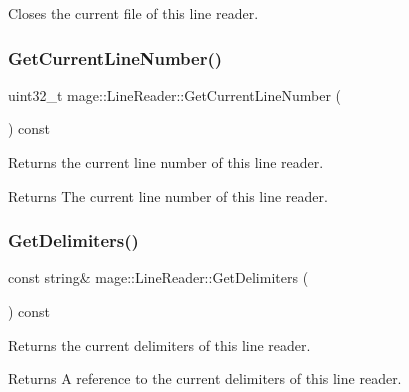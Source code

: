 Closes the current file of this line reader. \hypertarget{classmage_1_1_line_reader_a55f35bf4989ad109524da146639870d6}{}\label{classmage_1_1_line_reader_a55f35bf4989ad109524da146639870d6} 
\subsubsection{\texorpdfstring{Get\+Current\+Line\+Number()}{GetCurrentLineNumber()}}
{\footnotesize\ttfamily uint32\+\_\+t mage\+::\+Line\+Reader\+::\+Get\+Current\+Line\+Number (\begin{DoxyParamCaption}{ }\end{DoxyParamCaption}) const\hspace{0.3cm}{\ttfamily [protected]}}

Returns the current line number of this line reader.

\begin{DoxyReturn}{Returns}
The current line number of this line reader. 
\end{DoxyReturn}
\hypertarget{classmage_1_1_line_reader_a7de405beff27d5cc55bb93e1b1e9727a}{}\label{classmage_1_1_line_reader_a7de405beff27d5cc55bb93e1b1e9727a} 
\subsubsection{\texorpdfstring{Get\+Delimiters()}{GetDelimiters()}}
{\footnotesize\ttfamily const string\& mage\+::\+Line\+Reader\+::\+Get\+Delimiters (\begin{DoxyParamCaption}{ }\end{DoxyParamCaption}) const}

Returns the current delimiters of this line reader.

\begin{DoxyReturn}{Returns}
A reference to the current delimiters of this line reader. 
\end{DoxyReturn}
\hypertarget{classmage_1_1_line_reader_a64a800d9fe9c242b9b14d034a7d604eb}{}\label{classmage_1_1_line_reader_a64a800d9fe9c242b9b14d034a7d604eb} 
